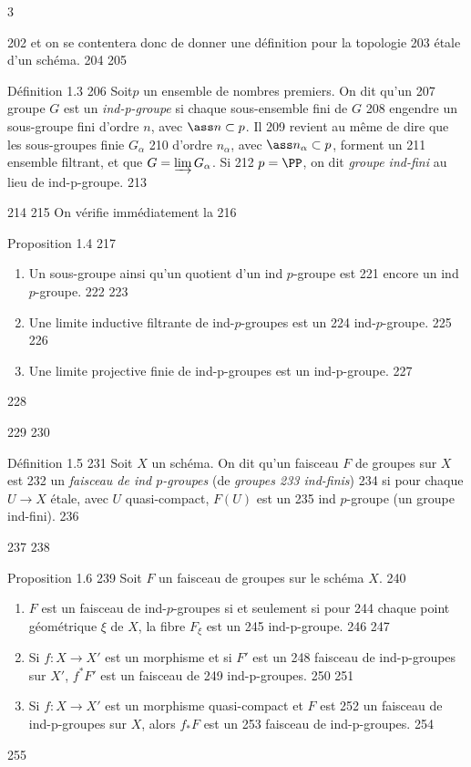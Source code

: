 3	\documentclass[10pt]{../fichiers-configuration-latex/smfart}
\begin{document}
   202	et on se contentera donc de donner une définition pour la topologie
   203	étale d'un schéma.
   204	
   205	\begin{enonce*}{Définition 1.3}
   206	Soit\pageoriginale $p$ un ensemble de nombres premiers. On dit qu'un
   207	groupe $G$ est un \emph{ind-p-groupe} si chaque sous-ensemble fini de $G$
   208	engendre un sous-groupe fini d'ordre $n$, avec $\ass n\subset p$. Il
   209	revient au même de dire que les sous-groupes finie $G_{\alpha}$
   210	d'ordre $n_{\alpha}$, avec $\ass n_{\alpha}\subset p$, forment un
   211	ensemble filtrant, et que $G=\varinjlim G_{\alpha}$. Si
   212	$p=\PP$, on dit \emph{groupe ind-fini} au lieu de ind-p-groupe.
   213	\end{enonce*}
   214	
   215	On vérifie immédiatement la
   216	\begin{enonce*}{Proposition 1.4}
   217	\begin{enumerate}
   218	\renewcommand{\theenumi}{\roman{enumi}}
   219	\renewcommand{\labelenumi}{(\theenumi)}
   220	\item Un sous-groupe ainsi qu'un quotient d'un ind $p$-groupe est
   221	  encore un ind $p$-groupe.
   222	
   223	\item Une limite inductive filtrante de ind-$p$-groupes est un
   224	  ind-$p$-groupe.
   225	
   226	\item Une limite projective finie de ind-p-groupes est un ind-p-groupe.
   227	\end{enumerate}
   228	\end{enonce*}
   229	
   230	\begin{enonce*}{Définition 1.5}
   231	Soit $X$ un schéma. On dit qu'un faisceau $F$ de groupes sur $X$ est
   232	un \emph{faisceau de ind $p$-groupes} (\resp de \emph{groupes
   233	  ind-finis})
   234	si pour chaque $U\rightarrow X$ étale, avec $U$ quasi-compact, $F(U)$ est un
   235	ind $p$-groupe (\resp un groupe ind-fini).
   236	\end{enonce*}
   237	
   238	\begin{enonce*}{Proposition 1.6}
   239	Soit $F$ un faisceau de groupes sur le schéma $X$.
   240	\begin{enumerate}
   241	\renewcommand{\theenumi}{\roman{enumi}}
   242	\renewcommand{\labelenumi}{(\theenumi)}
   243	\item $F$ est un faisceau de ind-$p$-groupes si et seulement si pour
   244	  chaque point géométrique $\xi$ de $X$, la fibre $F_{\xi}$ est un
   245	  ind-p-groupe.
   246	
   247	\item Si $f:X\rightarrow X'$ est un morphisme et si $F'$ est un
   248	  faisceau de ind-p-groupes sur $X'$, $f^{\ast}F'$ est un faisceau de
   249	  ind-p-groupes.
   250	
   251	\item Si $f:X\rightarrow X'$ est un morphisme quasi-compact et $F$ est
   252	  un faisceau de ind-p-groupes sur $X$, alors $f_{\ast}F$ est un
   253	  faisceau de ind-p-groupes.
   254	\end{enumerate}
   255	\end{enonce*}
\end{document}
